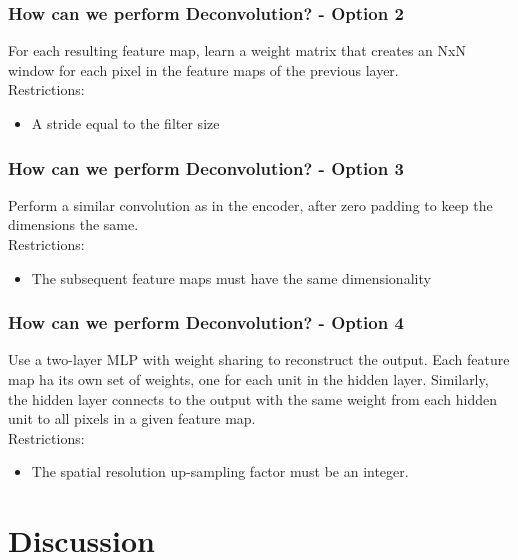 \documentclass{beamer}
\begin{document}
\begin{frame}
\frametitle{How can we perform Deconvolution? - Option 2}
For each resulting feature map, learn a weight matrix that creates an NxN window for each pixel in the feature maps of the previous layer.\\ \vspace{2mm}
Restrictions:
\begin{itemize}
\item A stride equal to the filter size
\end{itemize} 
\end{frame}

\begin{frame}
\frametitle{How can we perform Deconvolution? - Option 3}
Perform a similar convolution as in the encoder, after zero padding to keep the dimensions the same.\\ \vspace{2mm}
Restrictions:
\begin{itemize}
\item The subsequent feature maps must have the same dimensionality
\end{itemize} 
\end{frame}

\begin{frame}
\frametitle{How can we perform Deconvolution? - Option 4}

Use a two-layer MLP with weight sharing to reconstruct the output. Each feature map ha its own set of weights, one for each unit in the hidden layer. Similarly, the hidden layer connects to the output with the same weight from each hidden unit to all pixels in a given feature map.
\\ \vspace{2mm}
Restrictions:
\begin{itemize}
\item The spatial resolution up-sampling factor must be an integer.
\end{itemize} 
\end{frame}


\section{Discussion}
\end{document}
